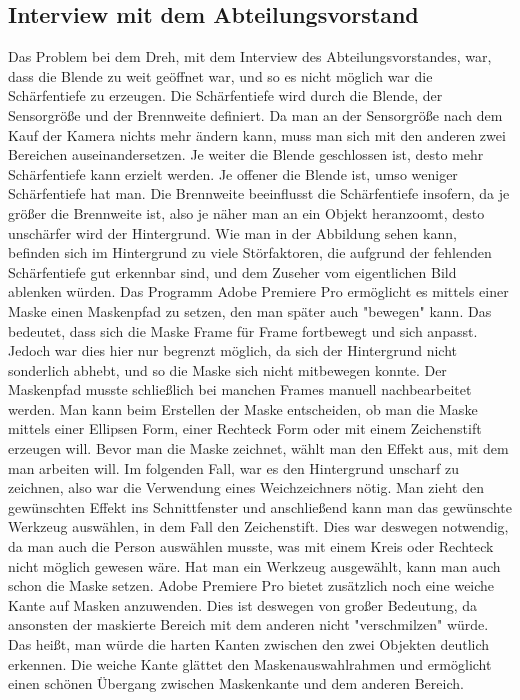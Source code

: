 \subsection{Interview mit dem Abteilungsvorstand}
Das Problem bei dem Dreh, mit dem Interview des Abteilungsvorstandes, war, dass die Blende zu weit geöffnet war, und so es nicht möglich war die Schärfentiefe zu erzeugen. Die Schärfentiefe wird durch die Blende, der Sensorgröße und der Brennweite definiert. Da man an der Sensorgröße nach dem Kauf der Kamera nichts mehr ändern kann, muss man sich mit den anderen zwei Bereichen auseinandersetzen. Je weiter die Blende geschlossen ist, desto mehr Schärfentiefe kann erzielt werden. Je offener die Blende ist, umso weniger Schärfentiefe hat man. Die Brennweite beeinflusst die Schärfentiefe insofern, da je größer die Brennweite ist, also je näher man an ein Objekt heranzoomt, desto unschärfer wird der Hintergrund. 
Wie man in der Abbildung sehen kann, befinden sich im Hintergrund zu viele Störfaktoren, die aufgrund der fehlenden Schärfentiefe gut erkennbar sind, und dem Zuseher vom eigentlichen Bild ablenken würden. 
Das Programm Adobe Premiere Pro ermöglicht es mittels einer Maske einen Maskenpfad zu setzen, den man später auch "bewegen" kann. Das bedeutet, dass sich die Maske Frame für Frame fortbewegt und sich anpasst. Jedoch war dies hier nur begrenzt möglich, da sich der Hintergrund nicht sonderlich abhebt, und so die Maske sich nicht mitbewegen konnte. Der Maskenpfad musste schließlich bei manchen Frames manuell nachbearbeitet werden.
Man kann beim Erstellen der Maske entscheiden, ob man die Maske mittels einer Ellipsen Form, einer Rechteck Form oder mit einem Zeichenstift erzeugen will. Bevor man die Maske zeichnet, wählt man den Effekt aus, mit dem man arbeiten will. Im folgenden Fall, war es den Hintergrund unscharf zu zeichnen, also war die Verwendung eines Weichzeichners nötig. Man zieht den gewünschten Effekt ins Schnittfenster und anschließend kann man das gewünschte Werkzeug auswählen, in dem Fall den Zeichenstift. Dies war deswegen notwendig, da man auch die Person auswählen musste, was mit einem Kreis oder Rechteck nicht möglich gewesen wäre. Hat man ein Werkzeug ausgewählt, kann man auch schon die Maske setzen. Adobe Premiere Pro bietet zusätzlich noch eine weiche Kante auf Masken anzuwenden. Dies ist deswegen von großer Bedeutung, da ansonsten der maskierte Bereich mit dem anderen nicht "verschmilzen" würde. Das heißt, man würde die harten Kanten zwischen den zwei Objekten deutlich erkennen. Die weiche Kante glättet den Maskenauswahlrahmen und ermöglicht einen schönen Übergang zwischen Maskenkante und dem anderen Bereich.
